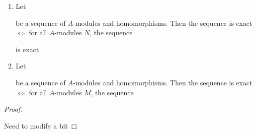 \documentclass[11pt]{article}
\begin{document}
\begin{proposition}[]
\label{2.9}
\begin{enumerate}
\item Let
\begin{center}\end{center}
be a sequence of \(A\)-modules and homomorphisms. Then the sequence is exact \(\Leftrightarrow\) for
all \(A\)-modules \(N\), the sequence
\begin{center}\end{center}
is exact
\item Let
\begin{center}\end{center}
be a sequence of \(A\)-modules and homomorphisms. Then the sequence is exact \(\Leftrightarrow\) for
all \(A\)-modules \(M\), the sequence
\begin{center}\end{center}
\end{enumerate}
\end{proposition}

\begin{proof}
\begin{center}\end{center}
Need to modify a bit
\end{proof}
\end{document}
